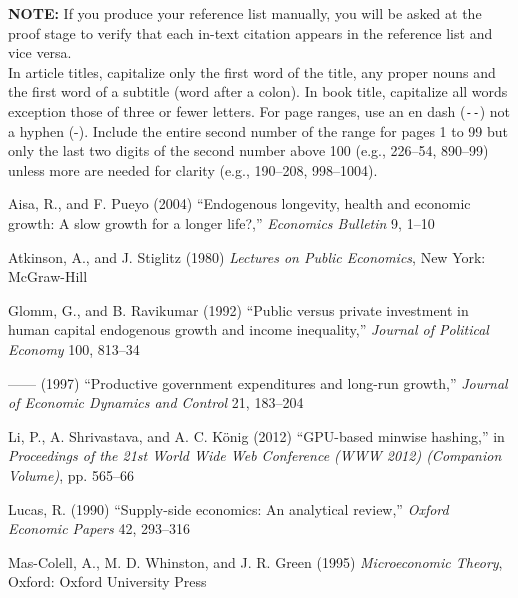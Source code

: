 \documentclass{cje}          %
\theoremstyle{plain}%
\theoremstyle{definition}
\theoremstyle{remark}
\begin{document}
\noindent \textbf{NOTE:} If you produce your reference list manually, you will be asked at the proof stage to verify that each in-text citation appears in the reference list and vice versa.
\\

In article titles, capitalize only the first word of the title, any proper nouns and the first word of a subtitle (word after a colon). In book title, capitalize all words exception those of three or fewer letters. For page ranges, use an en dash (\verb"--") not a hyphen (-). Include the entire second number of the range for pages 1 to 99 but only the last two digits of the second number above 100 (e.g., 226--54, 890--99) unless more are needed for clarity (e.g., 190--208, 998--1004).

\begin{smallverbatim}
\begin{thebibliography}{10}
\newcommand{\enquote}[1]{``#1''}

Aisa, R., and F. Pueyo (2004) \enquote{Endogenous longevity, health and
  economic growth: A slow growth for a longer life?,} \emph{Economics 
  Bulletin} 9, 1--10

Atkinson, A., and J. Stiglitz (1980) \emph{Lectures on Public Economics}, 
  New York: McGraw-Hill

Glomm, G., and B. Ravikumar (1992) \enquote{Public versus private 
  investment in human capital endogenous growth and income inequality,} 
  \emph{Journal of Political Economy} 100, 813--34

------ (1997) \enquote{Productive government expenditures and long-run 
  growth,} \emph{Journal of Economic Dynamics and Control} 21, 183--204

Li, P., A. Shrivastava, and A. C. K{\"o}nig (2012) \enquote{{GPU}-based 
  minwise hashing,} in \emph{Proceedings of the 21st World Wide Web 
  Conference (WWW 2012) (Companion Volume)}, pp. 565--66

Lucas, R. (1990) \enquote{Supply-side economics: An analytical review,}
  \emph{Oxford Economic Papers} 42, 293--316

Mas-Colell, A., M. D. Whinston, and J. R. Green (1995) \emph{Microeconomic
  Theory}, Oxford: Oxford University Press


\end{thebibliography}
\end{smallverbatim}
\end{document}
